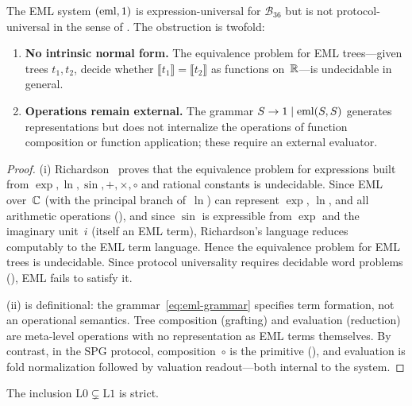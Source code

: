 \begin{theorem}
\label{thm:separation}
The EML system $(\operatorname{eml}, 1)$ is expression-universal for
$\mathcal{B}_{36}$ but is not protocol-universal in the sense of
.  The obstruction is twofold:
\begin{enumerate}[label=(\roman*)]
\item \textbf{No intrinsic normal form.}
  The equivalence problem for EML trees---given trees $t_{1}, t_{2}$,
  decide whether $\llbracket t_{1} \rrbracket =
  \llbracket t_{2} \rrbracket$ as functions on~$\mathbb{R}$---is
  undecidable in general.
\item \textbf{Operations remain external.}
  The grammar $S \to 1 \mid \operatorname{eml}(S,S)$ generates representations
  but does not internalize the operations of function composition
  or function application; these require an external evaluator.
\end{enumerate}
\end{theorem}

\begin{proof}
(i) Richardson~\cite{Richardson1968} proves that the equivalence
problem for expressions built from $\exp, \ln, \sin, +, \times,
\circ$ and rational constants is undecidable.
Since EML over~$\mathbb{C}$ (with the principal branch of~$\ln$) can
represent $\exp$, $\ln$, and all arithmetic operations
(), and since $\sin$ is expressible
from $\exp$ and the imaginary unit~$i$ (itself an EML term),
Richardson's language reduces computably to the EML term language.
Hence the equivalence problem for EML trees is undecidable.
Since protocol universality requires decidable word problems
(), EML fails to satisfy it.

(ii) is definitional: the grammar~\eqref{eq:eml-grammar}
specifies term formation, not an operational semantics.
Tree composition (grafting) and evaluation (reduction) are
meta-level operations with no representation as EML terms
themselves.  By contrast, in the SPG protocol, composition~$\circ$
is the primitive (), and evaluation is
fold normalization followed by valuation readout---both internal
to the system.
\end{proof}

\begin{corollary}\label{cor:strict-L0-L1}
The inclusion $\mathrm{L0} \subsetneq \mathrm{L1}$ is strict.
\end{corollary}

